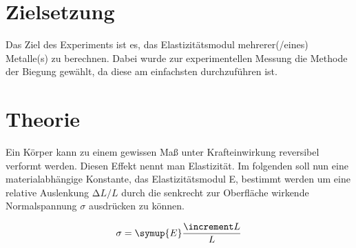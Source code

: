 \section{Zielsetzung}
\label{sec:Zielsetzung}

Das Ziel des Experiments ist es, das Elastizitätsmodul mehrerer(/eines) Metalle(s) zu berechnen.
Dabei wurde zur experimentellen Messung die Methode der Biegung gewählt, da diese am einfachsten durchzuführen ist.

\section{Theorie}
\label{sec:Theorie}

Ein Körper kann zu einem gewissen Maß unter Krafteinwirkung reversibel
verformt werden. Diesen Effekt nennt man Elastizität. Im folgenden soll nun
eine materialabhängige Konstante, das Elastizitätsmodul E, bestimmt werden
um eine relative Auslenkung $\increment L/L$ durch die senkrecht zur Oberfläche
wirkende Normalspannung $\sigma$ ausdrücken zu können.

\begin{equation}
  \sigma = \symup{E}\frac{\increment L}{L}
\end{equation}









\cite{litval}
